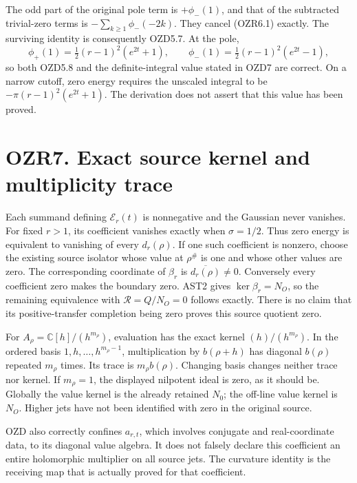 The odd part of the original pole term is \(+\phi_-(1)\), and that of
the subtracted trivial-zero terms is \(-\sum_{k\ge1}\phi_-(-2k)\). They
cancel (OZR6.1) exactly. The surviving identity is consequently OZD5.7.
At the pole, \[
\phi_+(1)=\tfrac12(r-1)^2(e^{2t}+1),\qquad
\phi_-(1)=\tfrac12(r-1)^2(e^{2t}-1),
\] so both OZD5.8 and the definite-integral value stated in OZD7 are
correct. On a narrow cutoff, zero energy requires the unscaled integral
to be \(-\pi(r-1)^2(e^{2t}+1)\). The derivation does not assert that
this value has been proved.

\section{OZR7. Exact source kernel and multiplicity
trace}\label{ozr7.-exact-source-kernel-and-multiplicity-trace}

Each summand defining \(\mathcal E_r(t)\) is nonnegative and the
Gaussian never vanishes. For fixed \(r>1\), its coefficient vanishes
exactly when \(\sigma=1/2\). Thus zero energy is equivalent to vanishing
of every \(d_r(\rho)\). If one such coefficient is nonzero, choose the
existing source isolator whose value at \(\rho^\#\) is one and whose
other values are zero. The corresponding coordinate of \(\beta_r\) is
\(\overline{d_r(\rho)}\ne0\). Conversely every coefficient zero makes
the boundary zero. AST2 gives \(\ker\beta_r=N_O\), so the remaining
equivalence with \(\mathcal R=Q/N_O=0\) follows exactly. There is no
claim that its positive-transfer completion being zero proves this
source quotient zero.

For \(A_\rho=\mathbb C[h]/(h^{m_\rho})\), evaluation has the exact
kernel \((h)/(h^{m_\rho})\). In the ordered basis
\(1,h,\ldots,h^{m_\rho-1}\), multiplication by \(b(\rho+h)\) has
diagonal \(b(\rho)\) repeated \(m_\rho\) times. Its trace is
\(m_\rho b(\rho)\). Changing basis changes neither trace nor kernel. If
\(m_\rho=1\), the displayed nilpotent ideal is zero, as it should be.
Globally the value kernel is the already retained \(N_0\); the off-line
value kernel is \(N_O\). Higher jets have not been identified with zero
in the original source.

OZD also correctly confines \(a_{r,t}\), which involves conjugate and
real-coordinate data, to its diagonal value algebra. It does not falsely
declare this coefficient an entire holomorphic multiplier on all source
jets. The curvature identity is the receiving map that is actually
proved for that coefficient.

